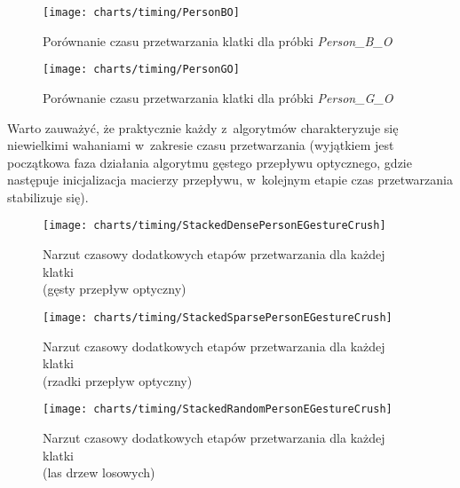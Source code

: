       \begin{figure}[!ht]
        \centering
        \texttt{[image: charts/timing/PersonBO]}
        \caption[Porównanie czasu przetwarzania klatki dla próbki Person\_B\_O]
                {Porównanie czasu przetwarzania klatki dla próbki \textit{Person\_B\_O}}
        \label{fig:PersonBO}
      \end{figure}

      \begin{figure}[!ht]
        \centering
        \texttt{[image: charts/timing/PersonGO]}
        \caption[Porównanie czasu przetwarzania klatki dla próbki Person\_G\_O]
                {Porównanie czasu przetwarzania klatki dla próbki \textit{Person\_G\_O}}
        \label{fig:PersonGO}
      \end{figure}

    Warto zauważyć, że praktycznie każdy z~algorytmów charakteryzuje się niewielkimi wahaniami w~zakresie czasu przetwarzania (wyjątkiem jest początkowa faza działania algorytmu gęstego przepływu optycznego, gdzie następuje inicjalizacja macierzy przepływu, w~kolejnym etapie czas przetwarzania stabilizuje się).

      \begin{figure}[!ht]
        \centering
        \texttt{[image: charts/timing/StackedDensePersonEGestureCrush]}
        \caption[Narzut czasowy dodatkowych etapów przetwarzania dla każdej klatki\\(gęsty przepływ optyczny)]
                {Narzut czasowy dodatkowych etapów przetwarzania dla każdej klatki\\(gęsty przepływ optyczny)}
        \label{fig:StackedDense}
      \end{figure}

      \begin{figure}[!ht]
        \centering
        \texttt{[image: charts/timing/StackedSparsePersonEGestureCrush]}
        \caption[Narzut czasowy dodatkowych etapów przetwarzania dla każdej klatki\\(rzadki przepływ optyczny)]
                {Narzut czasowy dodatkowych etapów przetwarzania dla każdej klatki\\(rzadki przepływ optyczny)}
        \label{fig:StackedSparse}
      \end{figure}

    \newpage
      \begin{figure}[!ht]
        \centering
        \texttt{[image: charts/timing/StackedRandomPersonEGestureCrush]}
        \caption[Narzut czasowy dodatkowych etapów przetwarzania dla każdej klatki\\(las drzew losowych)]
                {Narzut czasowy dodatkowych etapów przetwarzania dla każdej klatki\\(las drzew losowych)}
        \label{fig:StackedRandom}
      \end{figure}

